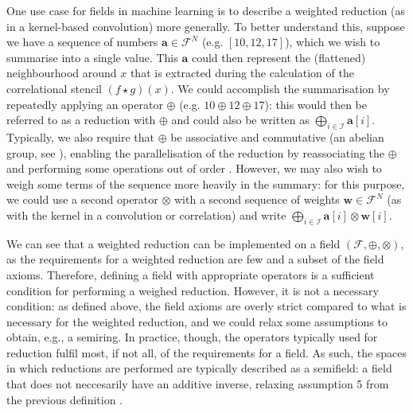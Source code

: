 \documentclass[a4paper, 12pt]{report}
\begin{document}
One use case for fields in machine learning is to describe a weighted reduction (as in a kernel-based convolution) more generally. To better understand this, suppose we have a sequence of numbers $\mathbf{a} \in \mathcal{F}^N$  (e.g. $[10, 12, 17]$), which we wish to summarise into a single value. This $\mathbf{a}$ could then represent the (flattened) neighbourhood around $x$ that is extracted during the calculation of the correlational stencil $(f \star g)(x)$. We could accomplish the summarisation by repeatedly applying an operator $\oplus$ (e.g. $10 \oplus 12 \oplus 17$): this would then be referred to as a reduction with $\oplus$ and could also be written as $\bigoplus_{i\in \mathcal{I}}\mathbf{a}[i]$. Typically, we also require that $\oplus$ be associative and commutative (an abelian group, see \cite{beachy2006abstract}), enabling the parallelisation of the reduction by reassociating the $\oplus$ and performing some operations out of order \cite{ppad}. However, we may also wish to weigh some terms of the sequence more heavily in the summary: for this purpose, we could use a second operator $\otimes$ with a second sequence of weights $\mathbf{w} \in \mathcal{F}^N$ (as with the kernel in a convolution or correlation) and write $\bigoplus_{i\in \mathcal{I}}\mathbf{a}[i] \otimes \mathbf{w}[i]$. 

We can see that a weighted reduction can be implemented on a field $(\mathcal{F}, \oplus, \otimes)$, as the requirements for a weighted reduction are few and a subset of the field axioms. Therefore, defining a field with appropriate operators is a sufficient condition for performing a weighed reduction. However, it is not a necessary condition: as defined above, the field axioms are overly strict compared to what is necessary for the weighted reduction, and we could relax some assumptions to obtain, e.g., a semiring. In practice, though, the operators typically used for reduction fulfil most, if not all, of the requirements for a field. As such, the spaces in which reductions are performed are typically described as a semifield: a field that does not neccesarily have an additive inverse, relaxing assumption 5 from the previous definition \cite{bellaardaxiomatic}.
\end{document}
